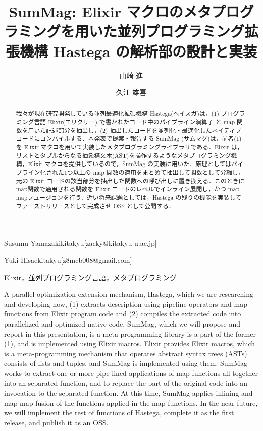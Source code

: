 \documentclass[submit,PRO]{ipsj}
\begin{document}
\title{SumMag: Elixir マクロのメタプログラミングを用いた並列プログラミング拡張機構 Hastega の解析部の設計と実装}



\author{山崎 進}{Susumu Yamazaki}{kitakyu}[zacky@kitakyu-u.ac.jp]
\author{久江 雄喜}{Yuki Hisae}{kitakyu}[z8mcb008@gmail.com]


\begin{abstract}
我々が現在研究開発している並列最適化拡張機構 Hastega(ヘイスガ)は，(1) プログラミング言語
Elixir(エリクサー) で書かれたコード中のパイプライン演算子 と map 関数を用いた記述部分を抽出し，(2)
抽出したコードを並列化・最適化したネイティブコードにコンパイルする．本発表で提案・報告する
SumMag (サムマグ)は，前者(1)を Elixir マクロを用いて実装したメタプログラミングライブラリである．Elixir
は，リストとタプルからなる抽象構文木(AST)を操作するようなメタプログラミング機構，Elixir
マクロを提供しているので，SumMag の実装に用いた．原理としてはパイプライン化された1つ以上の
map 関数の適用をまとめて抽出して関数として分離し，元の Elixir コードの該当部分を抽出した関数への呼び出しに置き換える．このときに
map関数で適用される関数を Elixir コードのレベルでインライン展開し，かつ
map-mapフュージョンを行う．近い将来課題としては，Hastega の残りの機能を実装してファーストリリースとして完成させ
OSS として公開する．
\end{abstract}


\begin{jkeyword}
Elixir，並列プログラミング言語，メタプログラミング
\end{jkeyword}


\begin{eabstract}
A parallel optimization extension mechanism, Hastega, which we are
researching and developing now, (1) extracts description using pipeline
operators and map functions from Elixir program code and (2) compiles
the extracted code into parallelized and optimized native code. SumMag,
which we will propose and report in this presentation, is a
meta-programming library is a part of the former (1), and is implemented
using Elixir macros. Elixir provides Elixir macros, which is a
meta-programming mechanism that operates abstract syntax trees (ASTs)
consists of lists and tuples, and SumMag is implemented using them.
SumMag works to extract one or more pipe-lined applications of map
functions all together into an separated function, and to replace the
part of the original code into an invocation to the separated function.
At this time, SumMag applies inlining and map-map fusion of the
functions applied in the map functions. In the near future, we will
implement the rest of functions of Hastega, complete it as the first
release, and publish it as an OSS.
\end{eabstract}
\end{document}
